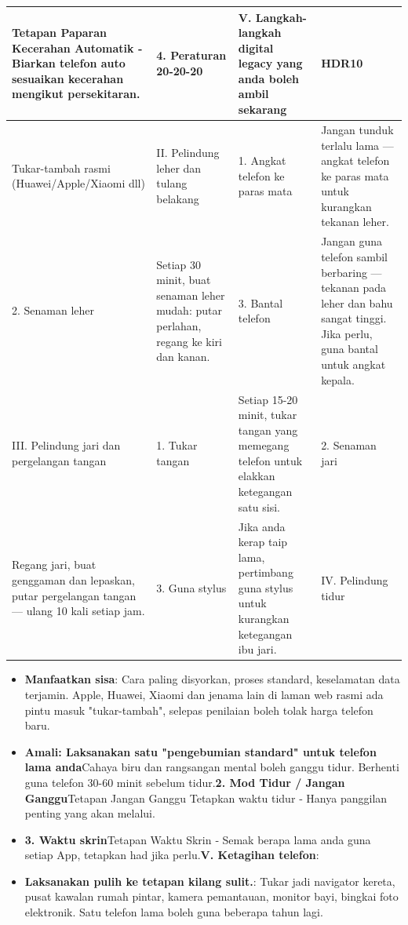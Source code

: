 \begin{center}
\begin{tabularx}{\linewidth}{|X|X|X|X|}
\hline
\textbf{Tetapan Paparan Kecerahan Automatik ‑ Biarkan telefon auto sesuaikan kecerahan mengikut persekitaran.} & \textbf{4. Peraturan 20-20-20} & \textbf{V. Langkah-langkah digital legacy yang anda boleh ambil sekarang} & \textbf{HDR10} \tabularnewline
\hline
Tukar-tambah rasmi (Huawei/Apple/Xiaomi dll) & II. Pelindung leher dan tulang belakang & 1. Angkat telefon ke paras mata & Jangan tunduk terlalu lama — angkat telefon ke paras mata untuk kurangkan tekanan leher. \tabularnewline
2. Senaman leher & Setiap 30 minit, buat senaman leher mudah: putar perlahan, regang ke kiri dan kanan. & 3. Bantal telefon & Jangan guna telefon sambil berbaring — tekanan pada leher dan bahu sangat tinggi. Jika perlu, guna bantal untuk angkat kepala. \tabularnewline
III. Pelindung jari dan pergelangan tangan & 1. Tukar tangan & Setiap 15-20 minit, tukar tangan yang memegang telefon untuk elakkan ketegangan satu sisi. & 2. Senaman jari \tabularnewline
Regang jari, buat genggaman dan lepaskan, putar pergelangan tangan — ulang 10 kali setiap jam. & 3. Guna stylus & Jika anda kerap taip lama, pertimbang guna stylus untuk kurangkan ketegangan ibu jari. & IV. Pelindung tidur \tabularnewline
\hline
\end{tabularx}
\end{center}

\begin{itemize}
  \item \textbf{Manfaatkan sisa}: Cara paling disyorkan, proses standard, keselamatan data terjamin. Apple, Huawei, Xiaomi dan jenama lain di laman web rasmi ada pintu masuk "tukar-tambah", selepas penilaian boleh tolak harga telefon baru.
  \item \textbf{Amali: Laksanakan satu "pengebumian standard" untuk telefon lama anda}Cahaya biru dan rangsangan mental boleh ganggu tidur. Berhenti guna telefon 30-60 minit sebelum tidur.\textbf{2. Mod Tidur / Jangan Ganggu}Tetapan Jangan Ganggu Tetapkan waktu tidur ‑ Hanya panggilan penting yang akan melalui.
  \item \textbf{3. Waktu skrin}Tetapan Waktu Skrin ‑ Semak berapa lama anda guna setiap App, tetapkan had jika perlu.\textbf{V. Ketagihan telefon}:
  \item \textbf{Laksanakan pulih ke tetapan kilang sulit.}: Tukar jadi navigator kereta, pusat kawalan rumah pintar, kamera pemantauan, monitor bayi, bingkai foto elektronik. Satu telefon lama boleh guna beberapa tahun lagi.
\end{itemize}

